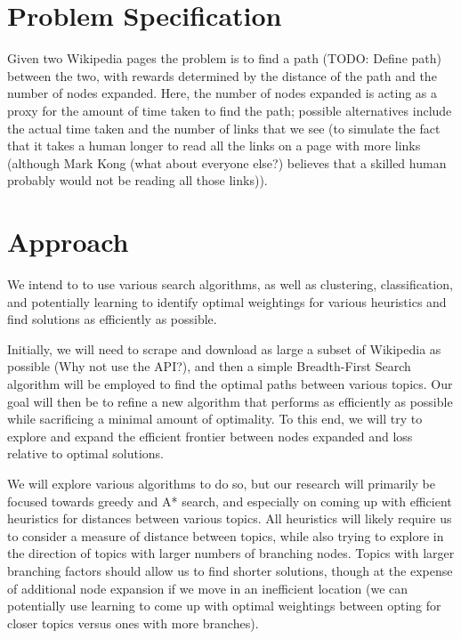 \documentclass[11pt]{article}
\begin{document}
\section{Problem Specification}

Given two Wikipedia pages the problem is to find a path (TODO: Define path) between the two, with rewards determined by the distance of the path and the number of nodes expanded.  Here, the number of nodes expanded is acting as a proxy for the amount of time taken to find the path; possible alternatives include the actual time taken and the number of links that we see (to simulate the fact that it takes a human longer to read all the links on a page with more links (although Mark Kong (what about everyone else?) believes that a skilled human probably would not be reading all those links)).

 \section{Approach}

We intend to to use various search algorithms, as well as clustering, classification, and potentially learning to identify optimal weightings for various heuristics and find solutions as efficiently as possible.

Initially, we will need to scrape and download as large a subset of Wikipedia as possible (Why not use the API?), and then a simple Breadth-First Search algorithm will be employed to find the optimal paths between various topics. Our goal will then be to refine a new algorithm that performs as efficiently as possible while sacrificing a minimal amount of optimality. To this end, we will try to explore and expand the efficient frontier between nodes expanded and loss relative to optimal solutions.

We will explore various algorithms to do so, but our research will primarily be focused towards greedy and A* search, and especially on coming up with efficient heuristics for distances between various topics. All heuristics will likely require us to consider a measure of distance between topics, while also trying to explore in the direction of topics with larger numbers of branching nodes. Topics with larger branching factors should allow us to find shorter solutions, though at the expense of additional node expansion if we move in an inefficient location (we can potentially use learning to come up with optimal weightings between opting for closer topics versus ones with more branches).
\end{document}

